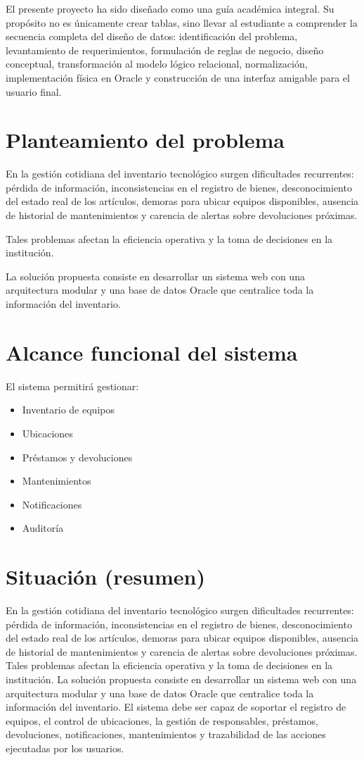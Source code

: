 \documentclass{article}
\begin{document}
El presente proyecto ha sido diseñado como una guía académica integral. Su propósito no es únicamente crear tablas, sino llevar al estudiante a comprender la secuencia completa del diseño de datos: identificación del problema, levantamiento de requerimientos, formulación de reglas de negocio, diseño conceptual, transformación al modelo lógico relacional, normalización, implementación física en Oracle y construcción de una interfaz amigable para el usuario final.

\section{Planteamiento del problema}

En la gestión cotidiana del inventario tecnológico surgen dificultades recurrentes: pérdida de información, inconsistencias en el registro de bienes, desconocimiento del estado real de los artículos, demoras para ubicar equipos disponibles, ausencia de historial de mantenimientos y carencia de alertas sobre devoluciones próximas.

Tales problemas afectan la eficiencia operativa y la toma de decisiones en la institución.

La solución propuesta consiste en desarrollar un sistema web con una arquitectura modular y una base de datos Oracle que centralice toda la información del inventario.
\section{Alcance funcional del sistema}

El sistema permitirá gestionar:

\begin{itemize}
    \item Inventario de equipos
    \item Ubicaciones
    \item Préstamos y devoluciones
    \item Mantenimientos
    \item Notificaciones
    \item Auditoría
\end{itemize}

\section{Situación (resumen)}

En la gestión cotidiana del inventario tecnológico surgen dificultades recurrentes: pérdida de información, inconsistencias en el registro de bienes, desconocimiento del estado real de los artículos, demoras para ubicar equipos disponibles, ausencia de historial de mantenimientos y carencia de alertas sobre devoluciones próximas. Tales problemas afectan la eficiencia operativa y la toma de decisiones en la institución. La solución propuesta consiste en desarrollar un sistema web con una arquitectura modular y una base de datos Oracle que centralice toda la información del inventario. El sistema debe ser capaz de soportar el registro de equipos, el control de ubicaciones, la gestión de responsables, préstamos, devoluciones, notificaciones, mantenimientos y trazabilidad de las acciones ejecutadas por los usuarios.
\end{document}
